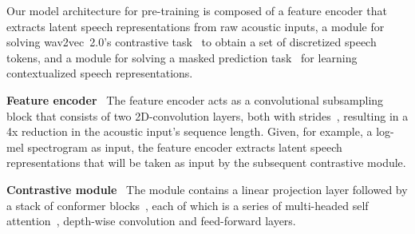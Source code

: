 \documentclass{article}
\begin{document}
\begin{table*}[htbp]
  \caption{Parameters for w2v-BERT models. Dim. stands for dimension.}
  \vskip 0.1in
  \label{tab:model_params}
  \centering
\end{table*}
Our model architecture for pre-training is composed of a feature encoder that extracts latent speech representations from raw acoustic inputs, a module for solving wav2vec~2.0's contrastive task~\cite{baevski2020wav2vec} to obtain a set of discretized speech tokens, and a module for solving a masked prediction task~\cite{devlin2019bert} for learning contextualized speech representations.

\newcommand{\myparagraph}[1]{\vspace{.4em} \noindent \textbf{#1}\ }
\myparagraph{Feature encoder}
The feature encoder acts as a convolutional subsampling block that consists of two 2D-convolution layers, both with strides~, resulting in a 4x reduction in the acoustic input's sequence length.
Given, for example, a log-mel spectrogram as input, the feature encoder extracts latent speech representations that will be taken as input by the subsequent contrastive module.

\myparagraph{Contrastive module}
The module contains a linear projection layer followed by a stack of conformer blocks~\cite{gulati2020conformer}, each of which is a series of multi-headed self attention~\cite{vaswani2017attention}, depth-wise convolution and feed-forward layers.
\end{document}

